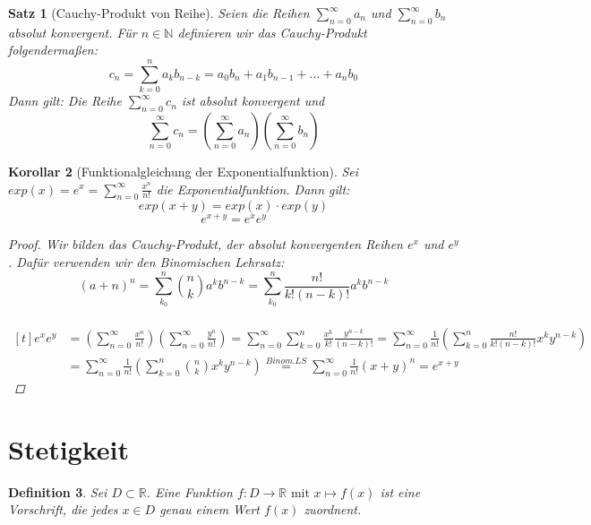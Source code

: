 \documentclass[a4paper,titlepage,oneside]{article}
\def\N{\ensuremath{\mathbb{N}} }
\def\R{\ensuremath{\mathbb{R}} }
\def\e{\ensuremath{\mathit{e}} }
\newcommand{\suminf}[2][n]{\ensuremath{\sum_{#1= 0}^{\infty}{#2}}}
\theoremstyle{thmstyle}
\newtheorem{satz}{Satz}[section]
\newtheorem{korr}[satz]{Korollar}
\newtheorem{defi}[satz]{Definition}
\theoremstyle{subthmstyle}
\begin{document}
\begin{satz}[Cauchy-Produkt von Reihe]
Seien die Reihen \suminf{a_n} und \suminf{b_n} absolut konvergent. Für $n \in \N$ definieren wir das Cauchy-Produkt folgendermaßen:
\[c_n = \sum_{k = 0}^{n}{a_k b_{n-k}} = a_0 b_n + a_1b_{n-1} + \dots + a_n b_0\]
Dann gilt: Die Reihe \suminf{c_n} ist absolut konvergent und \\
\[\suminf{c_n} = \left( \suminf{a_n} \right)  \left( \suminf{b_n} \right)\]
\proof[Beweisidee:]
\end{satz}

\begin{korr}[Funktionalgleichung der Exponentialfunktion]
Sei \(exp(x) = \e^x = \suminf{\frac{x^n}{n!}}\) die Exponentialfunktion. Dann gilt:
\[exp(x+y) = exp(x) \cdot exp(y)\]
\[e^{x+y} = e^x e^y\]
\begin{proof}
Wir bilden das Cauchy-Produkt, der absolut konvergenten Reihen $e^x$ und $ e^y$. Dafür verwenden wir den Binomischen Lehrsatz:
\[(a+n)^n = \sum_{k_0}^{n}{\binom{n}{k}a^kb^{n-k}} = \sum_{k_0}^{n}{\frac{n!}{k!(n-k)!}a^kb^{n-k}}\] \\
\begin{math}\displaystyle \begin{aligned}[t]
e^x e^y &= \left(\suminf{\frac{x^n}{n!}}\right)\left(\suminf{\frac{y^n}{n!}}\right)
= \suminf{\sum_{k = 0}^{n}{\frac{x^k}{k!}\frac{y^{n-k}}{(n-k)!}}}
= \suminf{\frac{1}{n!}\left(\sum_{k = 0}^{n}{\frac{n!}{k!(n-k)!}x^ky^{n-k}}\right)} \\
&= \suminf{\frac{1}{n!}\left(\sum_{k = 0}^{n}{\binom{n}{k}x^ky^{n-k}}\right)}
\overset{Binom.LS}{=} \suminf{\frac{1}{n!}(x+y)^n} = e^{x+y}
\end{aligned}\end{math} 
\end{proof}
\end{korr}


\newpage
\section{Stetigkeit}
\begin{defi}
Sei $ D \subset \R$. Eine Funktion $f : D \to \R \text{ mit } x \mapsto f(x) $ ist eine Vorschrift, die jedes $ x \in D$ genau einem Wert $f(x)$ zuordnent.
\end{defi}
\end{document}
